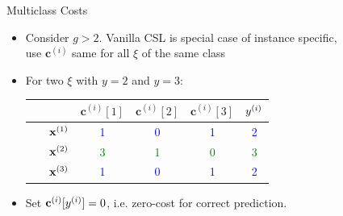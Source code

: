 \documentclass[11pt,compress,t,notes=noshow, aspectratio=169, xcolor=table]{beamer}
\newcommand{\cv}{\mathbf{c}}
\begin{document}
\begin{frame}{Multiclass Costs}
    \begin{itemize}

        \item Consider $g > 2$. Vanilla CSL is special case of instance specific,\\use $\cv^{(i)}$ same for all $\xi$ of the same class
        
        \vspace{5pt}
        
        \item For two $\xi$ with $y=2$ and $y = 3$: %
                \vspace{5pt}

                \begin{center}
                            \begin{tabular}{cc|cccc}\
        			& & $\cv^{(i)}[1]$ & $\cv^{(i)}[2]$ & $\cv^{(i)}[3]$ & $y^{(i)}$ \\
        			\hline & $\mathbf{x}^{(1)}$ & \textcolor{blue}{1} & \textcolor{blue}{0} & \textcolor{blue}{1} & \textcolor{blue}{2}\\
        			& $\mathbf{x}^{(2)}$ & \textcolor{green}{3} & \textcolor{green}{1} & \textcolor{green}{0} & \textcolor{green}{3}\\
                        & $\mathbf{x}^{(3)}$ & \textcolor{blue}{1} & \textcolor{blue}{0} & \textcolor{blue}{1} & \textcolor{blue}{2}\\
                \end{tabular}
        \end{center}

        \item Set $\cv^{(i)}[\yi] = 0$, i.e. zero-cost for correct prediction.
        \vspace{5pt}
        
            
    \end{itemize}
\end{frame}
\end{document}
